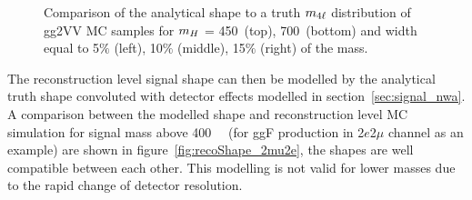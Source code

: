 \begin{figure}[!htbp]
    \caption{Comparison of the analytical shape to a truth $m_{4\ell}$ distribution of gg2VV MC samples for $m_{H}$ = 450~\gev (top), 700~\gev (bottom) 
    and width equal to 5$\%$ (left), 10$\%$ (middle), 15$\%$ (right) of the mass.}
    \label{fig:truthShape}
\end{figure}

The reconstruction level signal shape can then be modelled by the analytical truth shape convoluted with detector effects modelled in section~\ref{sec:signal_nwa}.
A comparison between the modelled shape and reconstruction level MC simulation for signal mass above 400~\gev~ (for ggF production in 2$e$2$\mu$ channel as an example) are shown in figure~\ref{fig:recoShape_2mu2e}, 
the shapes are well compatible between each other.
This modelling is not valid for lower masses due to the rapid change of detector resolution.

